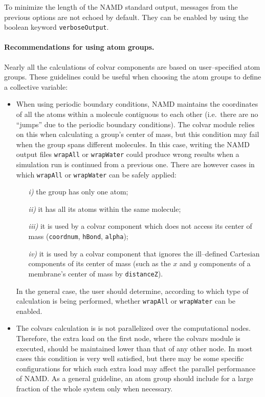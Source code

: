 To minimize the length of the NAMD standard output, messages from the
previous options are not echoed by default.  They can be enabled by
using the boolean keyword \texttt{verboseOutput}.


\paragraph*{Recommendations for using atom groups.}  Nearly all the
calculations of colvar components are based on user--specified atom
groups.  These guidelines could be useful when choosing the atom
groups to define a collective variable:

\begin{itemize}

\item When using periodic boundary conditions, NAMD maintains the
  coordinates of all the atoms within a molecule contiguous to each
  other (i.e.~there are no ``jumps'' due to the periodic boundary
  conditions).  The colvar module relies on this when calculating a
  group's center of mass, but this condition may fail when the group
  spans different molecules.  In this case, writing the NAMD output
  files \texttt{wrapAll} or \texttt{wrapWater} could produce wrong
  results when a simulation run is continued from a previous one.
  There are however cases in which \texttt{wrapAll} or
  \texttt{wrapWater} can be safely applied:
  \begin{enumerate}
  \item[\emph{i)}] the group has only one atom;
  \item[\emph{ii)}] it has all its atoms within the same molecule;
  \item[\emph{iii)}] it is used by a colvar component which does
    not access its center of mass (\texttt{coordnum},
    \texttt{hBond}, \texttt{alpha});
  \item[\emph{iv)}] it is used by a colvar component that ignores the
    ill--defined Cartesian components of its center of mass (such as
    the $x$ and $y$ components of a membrane's center of mass by
    \texttt{distanceZ}).
  \end{enumerate}    
  In the general case, the user should determine, according to which
  type of calculation is being performed, whether \texttt{wrapAll} or
  \texttt{wrapWater} can be enabled.

\item The colvars calculation is is not parallelized over the
  computational nodes.  Therefore, the extra load on the first node,
  where the colvars module is executed, should be maintained lower
  than that of any other node.  In most cases this condition is very
  well satisfied, but there may be some specific configurations for
  which such extra load may affect the parallel performance of NAMD.
  As a general guideline, an atom group should include for a large
  fraction of the whole system only when necessary.

\end{itemize}



